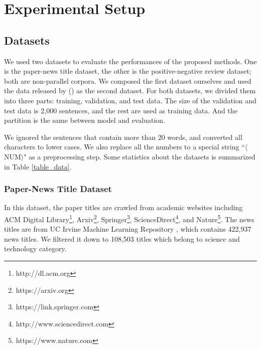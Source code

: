 \documentclass[letterpaper]{article} \usepackage{aaai18}  \usepackage{times}  \usepackage{helvet}  \usepackage{courier}  \usepackage{url}  \usepackage{graphicx}  \usepackage{amsmath}
\newcommand{\newcite}[1]{\citeauthor{#1} (\citeyear{#1})}
\begin{document}
\begin{table}[t]
\centering
{}
\caption{Size of datasets}
\label{table_data}
\end{table}



\section{Experimental Setup}


\subsection{Datasets}
We used two datasets to evaluate the performances of the proposed methods. One is the paper-news title dataset, 
the other is the positive-negative review dataset; both are non-parallel corpora. 
We composed the first dataset ourselves and used the data released by \newcite{he2016ups} 
as the second dataset. 
For both datasets, we divided them into three parts: training, validation, and test data. 
The size of the validation and test data is 2,000 sentences, and the rest are used as training data.
And the partition is the same between model and evaluation.
 
We ignored the sentences that contain more than 20 words, 
and converted all characters to lower cases. We also replace all the numbers to a special 
string ``$\langle $NUM$ \rangle$" as a preprocessing step.
Some statistics about the datasets is summarized  in Table \ref{table_data}. 

\subsubsection{Paper-News Title Dataset}
In this dataset, the paper titles are crawled from academic websites including ACM Digital Library\footnote{http://dl.acm.org}, 
Arxiv\footnote{https://arxiv.org}, Springer\footnote{https://link.springer.com}, 
ScienceDirect\footnote{http://www.sciencedirect.com}, and Nature\footnote{https://www.nature.com}. 
The news titles are from UC Irvine Machine Learning Repository \cite{Lichman:2013}, which contains 
422,937 news titles. We filtered it down to 108,503 titles which belong to science and technology category. 
\end{document}
